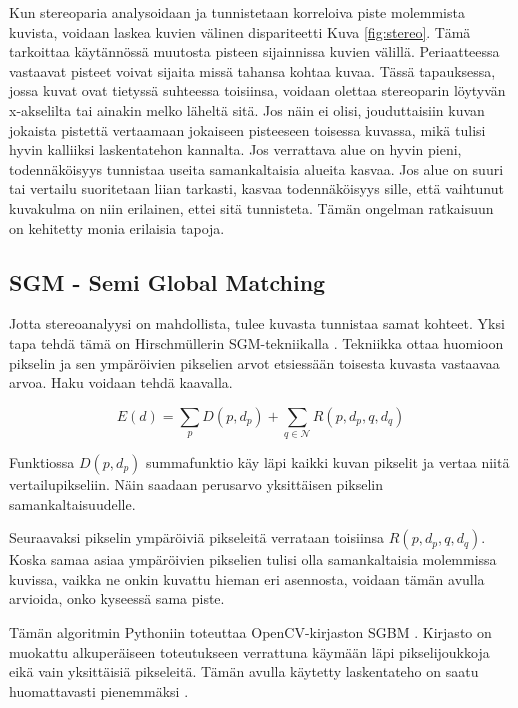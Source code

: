 Kun stereoparia analysoidaan ja tunnistetaan korreloiva piste molemmista kuvista,  
voidaan laskea kuvien välinen dispariteetti Kuva \ref{fig:stereo}. 
Tämä tarkoittaa käytännössä muutosta pisteen sijainnissa kuvien välillä. 
Periaatteessa vastaavat pisteet voivat sijaita missä tahansa kohtaa kuvaa.  
Tässä tapauksessa, jossa kuvat ovat tietyssä suhteessa toisiinsa, 
voidaan olettaa stereoparin löytyvän x-akselilta tai ainakin melko läheltä sitä.  
Jos näin ei olisi, jouduttaisiin kuvan jokaista pistettä vertaamaan jokaiseen pisteeseen toisessa kuvassa,  
mikä tulisi hyvin kalliiksi laskentatehon kannalta.  
Jos verrattava alue on hyvin pieni, todennäköisyys tunnistaa useita samankaltaisia alueita kasvaa.  
Jos alue on suuri tai vertailu suoritetaan liian tarkasti,  
kasvaa todennäköisyys sille, että vaihtunut kuvakulma on niin erilainen, ettei sitä tunnisteta.  
Tämän ongelman ratkaisuun on kehitetty monia erilaisia tapoja.  

\subsection{SGM - Semi Global Matching}

Jotta stereoanalyysi on mahdollista,
tulee kuvasta tunnistaa samat kohteet.
Yksi tapa tehdä tämä on Hirschmüllerin SGM-tekniikalla \cite{hirschmuller2005babel}.  
Tekniikka ottaa huomioon pikselin ja sen ympäröivien pikselien arvot etsiessään toisesta kuvasta vastaavaa arvoa. Haku voidaan tehdä kaavalla.

\begin{equation}\label{yht:SGM}
    E(d) = \sum_{p} D(p, d_p) + \sum_{q \in \mathcal{N}} R(p, d_p, q, d_q)
\end{equation}

Funktiossa \(D(p, d_p)\) summafunktio käy läpi kaikki kuvan pikselit ja vertaa niitä vertailupikseliin.  
Näin saadaan perusarvo yksittäisen pikselin samankaltaisuudelle.  

Seuraavaksi pikselin ympäröiviä pikseleitä verrataan toisiinsa \(R(p, d_p, q, d_q)\).  
Koska samaa asiaa ympäröivien pikselien tulisi olla samankaltaisia molemmissa kuvissa,  
vaikka ne onkin kuvattu hieman eri asennosta, voidaan tämän avulla arvioida, onko kyseessä sama piste.  

Tämän algoritmin Pythoniin toteuttaa OpenCV-kirjaston SGBM \cite{opencvsgbm}.  
Kirjasto on muokattu alkuperäiseen toteutukseen verrattuna käymään läpi pikselijoukkoja eikä vain yksittäisiä pikseleitä.  
Tämän avulla käytetty laskentateho on saatu huomattavasti pienemmäksi \cite{MemoryEfficientSGM}.  

